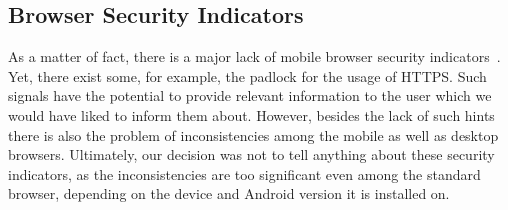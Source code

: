 \subsection{Browser Security Indicators}
As a matter of fact, there is a major lack of mobile browser security indicators~\cite{amrutkar2012measuring,trusteer2011}. 
Yet, there exist some, for example, the padlock for the usage of HTTPS.
Such signals have the potential to provide relevant information to the user which we would have liked to inform them about.
However, besides the lack of such hints there is also the problem of inconsistencies among the mobile as well as desktop browsers.
Ultimately, our decision was not to tell anything about these security indicators, as the inconsistencies are too significant even among the standard browser, depending on the device and Android version it is installed on.
